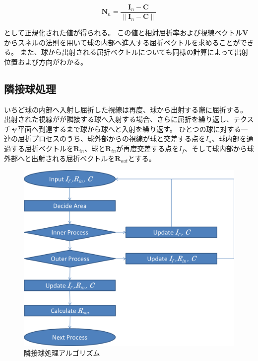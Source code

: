 \begin{equation}
\label{ENd}
\bm{N}_n = \frac{\bm{I}_n - \bm{C}}{\|\bm{I}_n - \bm{C}\|}
\end{equation}

\noindent
として正規化された値が得られる。
この値と相対屈折率および視線ベクトル$\bm{V}$からスネルの法則を用いて球の内部へ進入する屈折ベクトルを求めることができる。
また、球から出射される屈折ベクトルについても同様の計算によって出射位置および方向がわかる。

\subsection{隣接球処理}
\label{SSMultiRefraction}

いちど球の内部へ入射し屈折した視線は再度、球から出射する際に屈折する。
出射された視線がが隣接する球へ入射する場合、さらに屈折を繰り返し、テクスチャ平面へ到達するまで球から球へと入射を繰り返す。
ひとつの球に対する一連の屈折プロセスのうち、球外部からの視線が球と交差する点を$I_n$、球内部を通過する屈折ベクトルを$\bm{R}_{in}$、球と$\bm{R}_{in}$が再度交差する点を$I_f$、そして球内部から球外部へと出射される屈折ベクトルを$\bm{R}_{out}$とする。

\begin{figure}[h]
  \centering
  \includegraphics[width=4.5in]{./img/graph/next_sphere_algorithm.png}
  \caption{隣接球処理アルゴリズム}
  \label{FAlgoNextSphere}
\end{figure}

